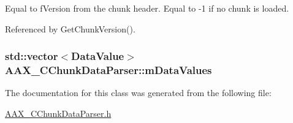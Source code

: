 Equal to f\+Version from the chunk header. Equal to -\/1 if no chunk is loaded. 



Referenced by Get\+Chunk\+Version().

\hypertarget{a00014_af3963982859b42ddebdcaeba36dd1d29}{}
\subsubsection[{m\+Data\+Values}]{\setlength{\rightskip}{0pt plus 5cm}std\+::vector$<${\bf Data\+Value}$>$ A\+A\+X\+\_\+\+C\+Chunk\+Data\+Parser\+::m\+Data\+Values}\label{a00014_af3963982859b42ddebdcaeba36dd1d29}


The documentation for this class was generated from the following file\+:\begin{DoxyCompactItemize}
\item 
\hyperlink{a00168}{A\+A\+X\+\_\+\+C\+Chunk\+Data\+Parser.\+h}\end{DoxyCompactItemize}
